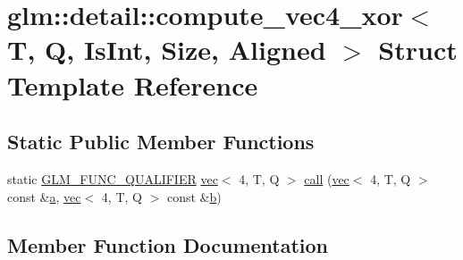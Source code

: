\hypertarget{structglm_1_1detail_1_1compute__vec4__xor}{}\section{glm\+:\+:detail\+:\+:compute\+\_\+vec4\+\_\+xor$<$ T, Q, Is\+Int, Size, Aligned $>$ Struct Template Reference}
\label{structglm_1_1detail_1_1compute__vec4__xor}
\subsection*{Static Public Member Functions}
\begin{DoxyCompactItemize}
\item 
static \mbox{\hyperlink{setup_8hpp_a33fdea6f91c5f834105f7415e2a64407}{G\+L\+M\+\_\+\+F\+U\+N\+C\+\_\+\+Q\+U\+A\+L\+I\+F\+I\+ER}} \mbox{\hyperlink{structglm_1_1vec}{vec}}$<$ 4, T, Q $>$ \mbox{\hyperlink{structglm_1_1detail_1_1compute__vec4__xor_ad31aa7edcbc6cadcb41b9f9aac4c7c50}{call}} (\mbox{\hyperlink{structglm_1_1vec}{vec}}$<$ 4, T, Q $>$ const \&\mbox{\hyperlink{_s_d_l__opengl__glext_8h_a3309789fc188587d666cda5ece79cf82}{a}}, \mbox{\hyperlink{structglm_1_1vec}{vec}}$<$ 4, T, Q $>$ const \&\mbox{\hyperlink{_s_d_l__opengl__glext_8h_a0f71581a41fd2264c8944126dabbd010}{b}})
\end{DoxyCompactItemize}


\subsection{Member Function Documentation}
\mbox{\label{structglm_1_1detail_1_1compute__vec4__xor_ad31aa7edcbc6cadcb41b9f9aac4c7c50}} 
